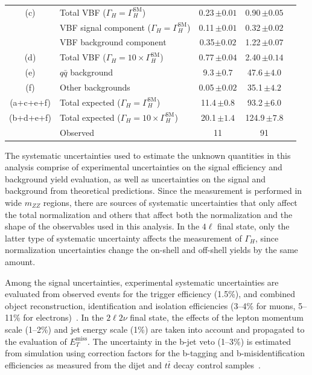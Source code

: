 \begin{table}
\begin{tabular}{clccc}
\hline
(c)& Total VBF ($\Gamma_{H} = \Gamma_{H}^{\mathrm{SM}}$)         & 0.23\,$\pm 0.01$    & 0.90\,$\pm 0.05$ & \\
 & VBF signal component ($\Gamma_{H} = \Gamma_{H}^{\mathrm{SM}}$)          & 0.11\,$\pm 0.01$    & 0.32\,$\pm 0.02$ & \\
 & VBF background component                                                  & 0.35$\pm 0.02$      & 1.22\,$\pm 0.07$ & \\
(d)& Total VBF ($\Gamma_{H} = 10 \times \Gamma_{H}^{\mathrm{SM}}$)        & 0.77\,$\pm 0.04$  & 2.40\,$\pm 0.14$ & \\
\hline
(e)& $q\bar{q}$ background                      & 9.3\,$\pm 0.7$    & 47.6\,$\pm 4.0$ & \\
(f)& Other backgrounds                                             & 0.05\,$\pm 0.02$    & 35.1\,$\pm 4.2$ & \\
\hline
(a+c+e+f)& Total expected ($\Gamma_{H} = \Gamma_{H}^{\mathrm{SM}}$)       & 11.4\,$\pm 0.8$ & 93.2\,$\pm 6.0$ & \\
(b+d+e+f)& Total expected ($\Gamma_{H} = 10 \times \Gamma_{H}^{\mathrm{SM}}$) & 20.1\,$\pm1.4$  & 124.9\,$\pm 7.8$ & \\
\hline
& Observed                                                         & 11                & 91 & \\
\hline
\hline
\end{tabular}
\label{tab:yields}
\end{table}

The systematic uncertainties used to estimate the unknown quantities in this analysis comprise of experimental uncertainties on the signal efficiency and
background yield evaluation, as well as uncertainties on the signal and background from
theoretical predictions. Since the measurement is performed in wide $m_{ZZ}$ regions, there
are sources of systematic uncertainties that only affect the total normalization and
others that affect both the normalization and the shape of the observables used in this
analysis. In the $4\ell$ final state, only the latter type of systematic uncertainty
affects the measurement of $\Gamma_{H}$, since normalization uncertainties change the on-shell
and off-shell yields by the same amount.

Among the signal uncertainties, experimental systematic uncertainties are evaluated
from observed events for the trigger efficiency (1.5\%), and combined object reconstruction,
identification and isolation efficiencies (3--4\% for muons, 5--11\% for electrons)~\cite{Chatrchyan:2013mxa}.
In the $2\ell 2\nu$ final state, the effects of the lepton momentum scale (1--2\%) and jet
energy scale (1\%) are taken into account and propagated to the evaluation of $E_{T}^{\text{miss}}$.
The uncertainty in the b-jet veto (1--3\%) is estimated from simulation using
correction factors for the b-tagging and b-misidentification efficiencies as measured
from the dijet and $t\bar{t}$ decay control samples~\cite{Chatrchyan:2012jua}.

